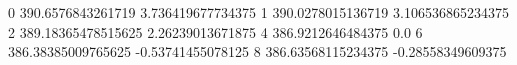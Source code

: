 0 390.6576843261719 3.736419677734375
1 390.0278015136719 3.106536865234375
2 389.18365478515625 2.26239013671875
4 386.9212646484375 0.0
6 386.38385009765625 -0.53741455078125
8 386.63568115234375 -0.28558349609375
